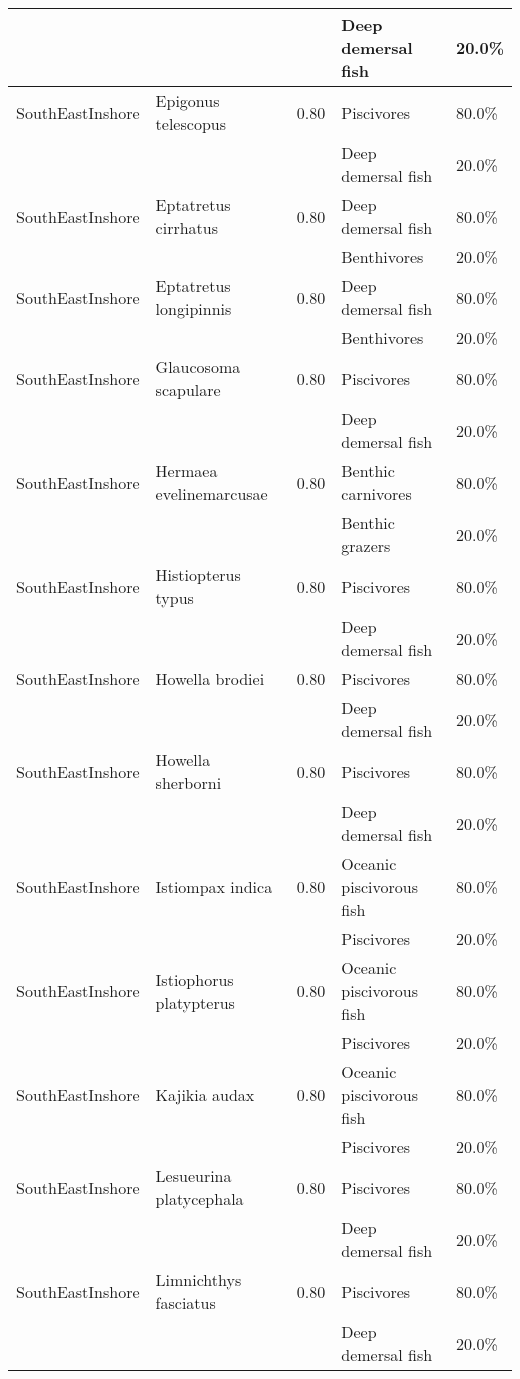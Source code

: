 \begin{longtable}{llcll}
& & & Deep demersal fish & 20.0\% \\
\hline
SouthEastInshore & Epigonus telescopus & 0.80 & Piscivores & 80.0\% \\
& & & Deep demersal fish & 20.0\% \\
\hline
SouthEastInshore & Eptatretus cirrhatus & 0.80 & Deep demersal fish & 80.0\% \\
& & & Benthivores & 20.0\% \\
\hline
SouthEastInshore & Eptatretus longipinnis & 0.80 & Deep demersal fish & 80.0\% \\
& & & Benthivores & 20.0\% \\
\hline
SouthEastInshore & Glaucosoma scapulare & 0.80 & Piscivores & 80.0\% \\
& & & Deep demersal fish & 20.0\% \\
\hline
SouthEastInshore & Hermaea evelinemarcusae & 0.80 & Benthic carnivores & 80.0\% \\
& & & Benthic grazers & 20.0\% \\
\hline
SouthEastInshore & Histiopterus typus & 0.80 & Piscivores & 80.0\% \\
& & & Deep demersal fish & 20.0\% \\
\hline
SouthEastInshore & Howella brodiei & 0.80 & Piscivores & 80.0\% \\
& & & Deep demersal fish & 20.0\% \\
\hline
SouthEastInshore & Howella sherborni & 0.80 & Piscivores & 80.0\% \\
& & & Deep demersal fish & 20.0\% \\
\hline
SouthEastInshore & Istiompax indica & 0.80 & Oceanic piscivorous fish & 80.0\% \\
& & & Piscivores & 20.0\% \\
\hline
SouthEastInshore & Istiophorus platypterus & 0.80 & Oceanic piscivorous fish & 80.0\% \\
& & & Piscivores & 20.0\% \\
\hline
SouthEastInshore & Kajikia audax & 0.80 & Oceanic piscivorous fish & 80.0\% \\
& & & Piscivores & 20.0\% \\
\hline
SouthEastInshore & Lesueurina platycephala & 0.80 & Piscivores & 80.0\% \\
& & & Deep demersal fish & 20.0\% \\
\hline
SouthEastInshore & Limnichthys fasciatus & 0.80 & Piscivores & 80.0\% \\
& & & Deep demersal fish & 20.0\% \\

\end{longtable}
